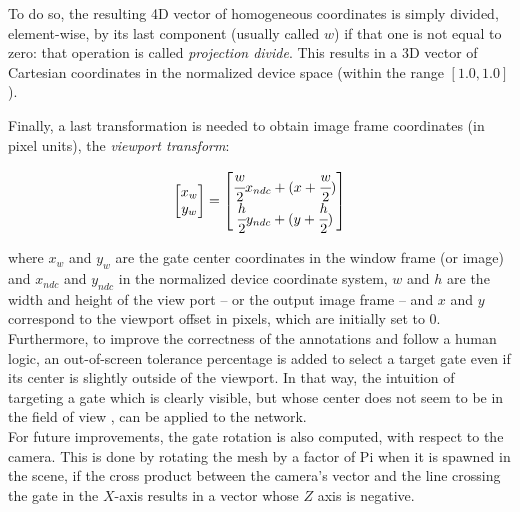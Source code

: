 
To do so, the resulting 4D vector of homogeneous coordinates is simply divided,
element-wise, by its last component (usually called $w$) if that one is not
equal to zero: that operation is called \emph{projection divide}. This results
in a 3D vector of Cartesian coordinates in the normalized device space (within
the range $[1.0, 1.0]$).

Finally, a last transformation is needed to obtain image frame coordinates (in
pixel units), the \emph{viewport transform}:

\begin{equation}
	\begin{bmatrix}
		x_w\\y_w
	\end{bmatrix}
	=
	\begin{bmatrix}
		\cfrac{w}{2} x_{ndc} + (x + \cfrac{w}{2})\\
		\cfrac{h}{2} y_{ndc} + (y + \cfrac{h}{2})\\
	\end{bmatrix}
\end{equation}

where $x_w$ and $y_w$ are the gate center coordinates in the window
frame (or image) and $x_{ndc}$ and $y_{ndc}$ in the normalized device
coordinate system, $w$ and $h$ are the width and height of the view port -- or
the output image frame -- and $x$ and $y$ correspond to the viewport offset in
pixels, which are initially set to 0.\\

Furthermore, to improve the correctness of the annotations and follow a human
logic, an out-of-screen tolerance percentage is added to select a target gate
even if its center is slightly outside of the viewport. In that way, the
intuition of targeting a gate which is clearly visible, but whose center does
not seem to be in the field of view , can be applied to the network.\\

For future improvements, the gate rotation is also computed, with respect to
the camera. This is done by rotating the mesh by a factor of Pi when it is
spawned in the scene, if the cross product between the camera's vector and the
line crossing the gate in the $X$-axis results in a vector whose $Z$ axis is
negative.
